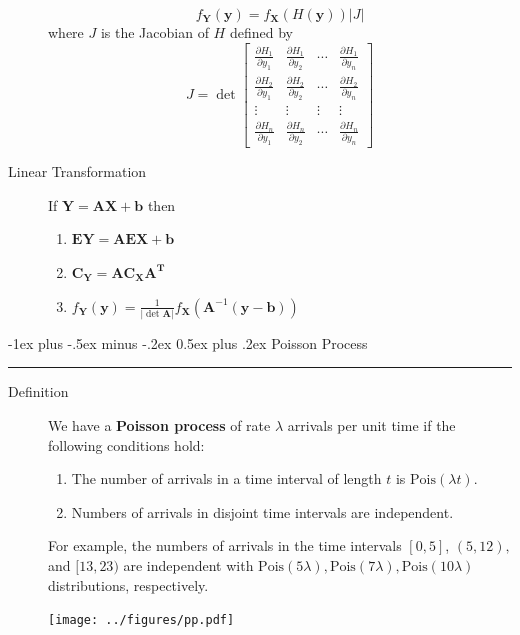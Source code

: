 \documentclass[10pt,landscape]{article}
\makeatletter
\newcommand{\Pois}{\textrm{Pois}}
\renewcommand{\section}{\@startsection{section}{1}{0mm}%
                                {-1ex plus -.5ex minus -.2ex}%
                                {0.5ex plus .2ex}%
                                {\normalfont\large\bfseries}}
\makeatother
\begin{document}
\begin{multicols*}{3}
\begin{description}
        \[
            f_{\mathbf{Y}}(\mathbf{y})=f_{\mathbf{X}}(H(\mathbf{y}))|J|
        \]
        where $J$ is the Jacobian of $H$ defined by
        \[
            J=\det \left[\begin{array}{cccc}
                \frac{\partial H_{1}}{\partial y_{1}} & \frac{\partial H_{1}}{\partial y_{2}} & \cdots & \frac{\partial H_{1}}{\partial y_{n}} \\
                \frac{\partial H_{2}}{\partial y_{1}} & \frac{\partial H_{2}}{\partial y_{2}} & \cdots & \frac{\partial H_{2}}{\partial y_{n}} \\
                \vdots & \vdots & \vdots & \vdots \\
                \frac{\partial H_{n}}{\partial y_{1}} & \frac{\partial H_{n}}{\partial y_{2}} & \cdots & \frac{\partial H_{n}}{\partial y_{n}}
            \end{array}\right]
        \]
        \item[Linear Transformation] If $\mathbf{Y} = \mathbf{AX + b}$ then 
        \begin{enumerate}
            \item $\mathbf{EY} = \mathbf{AEX + b}$
            \item $\mathbf{C}_{\mathbf{Y}}=\mathbf{A} \mathbf{C}_{\mathbf{X}} \mathbf{A}^{\mathbf{T}}$
            \item $f_{\mathbf{Y}}(\mathbf{y})=\frac{1}{|\det{\mathbf{A}}|} f_{\mathbf{X}}\left(\mathbf{A}^{-1}(\mathbf{y}-\mathbf{b})\right)$
        \end{enumerate}
    \end{description}
                    
    \section{Poisson Process}\smallskip \hrule height 2pt \smallskip
    \begin{description}
        \item[Definition] We have a \textbf{Poisson process} of rate $\lambda$ arrivals per unit time if the following conditions hold:
        \begin{enumerate}
            \item The number of arrivals in a time interval of length $t$ is $\Pois(\lambda t)$.
            \item Numbers of arrivals in disjoint time intervals are independent.
        \end{enumerate}
        For example, the numbers of arrivals in the time intervals $[0,5]$, $(5,12),$ and $[13,23)$ are independent with $\Pois(5\lambda), \Pois(7\lambda), \Pois(10\lambda)$ distributions, respectively.
        \begin{minipage}{\linewidth}
            \centering
            \texttt{[image: ../figures/pp.pdf]}
        \end{minipage}
                                               

\end{description}
\end{multicols*}
\end{document}
